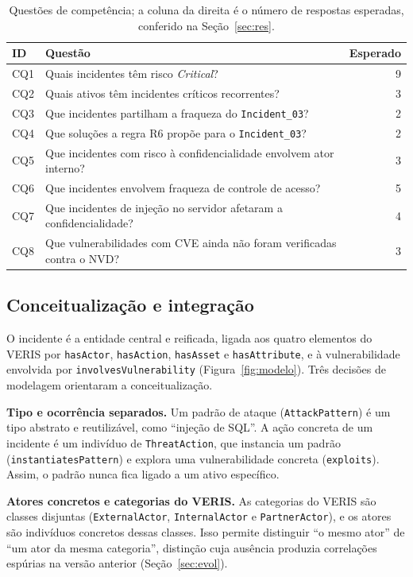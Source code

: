 \documentclass[12pt]{article}
\newcommand{\oc}[1]{\texttt{#1}}
\begin{document}
\begin{table}[ht]
\centering\small
\caption{Questões de competência; a coluna da direita é o número de respostas esperadas, conferido na Seção~\ref{sec:res}.}
\label{tab:cq}
\begin{tabularx}{\textwidth}{@{}lXr@{}}
\toprule
ID & Questão & Esperado\\
\midrule
CQ1 & Quais incidentes têm risco \emph{Critical}? & 9\\
CQ2 & Quais ativos têm incidentes críticos recorrentes? & 3\\
CQ3 & Que incidentes partilham a fraqueza do \oc{Incident\_03}? & 2\\
CQ4 & Que soluções a regra R6 propõe para o \oc{Incident\_03}? & 2\\
CQ5 & Que incidentes com risco à confidencialidade envolvem ator interno? & 3\\
CQ6 & Que incidentes envolvem fraqueza de controle de acesso? & 5\\
CQ7 & Que incidentes de injeção no servidor afetaram a confidencialidade? & 4\\
CQ8 & Que vulnerabilidades com CVE ainda não foram verificadas contra o NVD? & 3\\
\bottomrule
\end{tabularx}
\end{table}

\subsection{Conceitualização e integração}

O incidente é a entidade central e reificada, ligada aos quatro elementos do VERIS por \oc{hasActor}, \oc{hasAction}, \oc{hasAsset} e \oc{hasAttribute}, e à vulnerabilidade envolvida por \oc{involvesVulnerability} (Figura~\ref{fig:modelo}). Três decisões de modelagem orientaram a conceitualização.

\textbf{Tipo e ocorrência separados.} Um padrão de ataque (\oc{AttackPattern}) é um tipo abstrato e reutilizável, como ``injeção de SQL''. A ação concreta de um incidente é um indivíduo de \oc{ThreatAction}, que instancia um padrão (\oc{instantiatesPattern}) e explora uma vulnerabilidade concreta (\oc{exploits}). Assim, o padrão nunca fica ligado a um ativo específico.

\textbf{Atores concretos e categorias do VERIS.} As categorias do VERIS são classes disjuntas (\oc{ExternalActor}, \oc{InternalActor} e \oc{PartnerActor}), e os atores são indivíduos concretos dessas classes. Isso permite distinguir ``o mesmo ator'' de ``um ator da mesma categoria'', distinção cuja ausência produzia correlações espúrias na versão anterior (Seção~\ref{sec:evol}).
\end{document}
